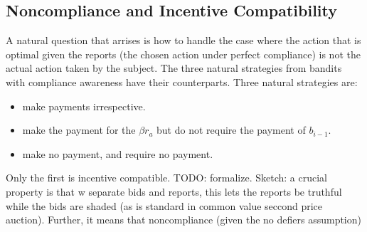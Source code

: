 

	




\subsection{Noncompliance and Incentive Compatibility}

A natural question that arrises is how to handle the case where the action that is optimal given the reports (the chosen action under perfect compliance) is not the actual action taken by the subject. The three natural strategies from bandits with compliance awareness have their counterparts. Three natural strategies are:

\begin{itemize}
\item make payments irrespective. 
\item make the payment for the $\beta r_a$ but do not require the payment of $b_{i-1}$.
\item make no payment, and require no payment.
\end{itemize}

Only the first is incentive compatible. TODO: formalize. Sketch: a crucial property is that w separate bids and reports, this lets the reports be truthful while the bids are shaded (as is standard in common value seccond price auction). Further, it means that noncompliance (given the no defiers assumption) 


